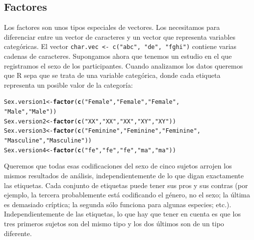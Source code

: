 \documentclass{config/apuntes}\usepackage[]{graphicx}\usepackage[]{xcolor}
\makeatletter
\newcommand{\hlsng}[1]{\textcolor[rgb]{0.192,0.494,0.8}{#1}}%
\newcommand{\hldef}[1]{\textcolor[rgb]{0.345,0.345,0.345}{#1}}%
\newcommand{\hlkwb}[1]{\textcolor[rgb]{0.69,0.353,0.396}{#1}}%
\newcommand{\hlkwd}[1]{\textcolor[rgb]{0.737,0.353,0.396}{\textbf{#1}}}%
\newenvironment{kframe}{%
 \def\at@end@of@kframe{}%
 \ifinner\ifhmode%
  \def\at@end@of@kframe{\end{minipage}}%
  \begin{minipage}{\columnwidth}%
 \fi\fi%
 \def\FrameCommand##1{\hskip\@totalleftmargin \hskip-\fboxsep
 \colorbox{shadecolor}{##1}\hskip-\fboxsep
     \hskip-\linewidth \hskip-\@totalleftmargin \hskip\columnwidth}%
 \MakeFramed {\advance\hsize-\width
   \@totalleftmargin\z@ \linewidth\hsize
   \@setminipage}}%
 {\par\unskip\endMakeFramed%
 \at@end@of@kframe}
\newenvironment{knitrout}{}{} %
\newcommand{\code}[1]{\texttt{#1}}
\makeatother
\begin{document}
\subsection{Factores}
Los factores son unos tipos especiales de vectores. Los necesitamos para diferenciar entre un vector de caracteres y un vector que representa variables categóricas. El vector \code{char.vec <- c("abc", "de", "fghi")} contiene varias cadenas de caracteres. Supongamos ahora que tenemos un estudio en el que registramos el sexo de los participantes. Cuando analizamos los datos queremos que R sepa que se trata de una variable categórica, donde cada etiqueta representa un posible valor de la categoría:
\begin{knitrout}
\color{fgcolor}\begin{kframe}
\begin{alltt}
\hldef{Sex.version1} \hlkwb{<-} \hlkwd{factor}\hldef{(}\hlkwd{c}\hldef{(}\hlsng{"Female"}\hldef{,} \hlsng{"Female"}\hldef{,} \hlsng{"Female"}\hldef{,}
                         \hlsng{"Male"}\hldef{,} \hlsng{"Male"}\hldef{))}
\hldef{Sex.version2} \hlkwb{<-} \hlkwd{factor}\hldef{(}\hlkwd{c}\hldef{(}\hlsng{"XX"}\hldef{,} \hlsng{"XX"}\hldef{,} \hlsng{"XX"}\hldef{,} \hlsng{"XY"}\hldef{,} \hlsng{"XY"}\hldef{))}
\hldef{Sex.version3} \hlkwb{<-} \hlkwd{factor}\hldef{(}\hlkwd{c}\hldef{(}\hlsng{"Feminine"}\hldef{,} \hlsng{"Feminine"}\hldef{,} \hlsng{"Feminine"}\hldef{,}
                         \hlsng{"Masculine"}\hldef{,} \hlsng{"Masculine"}\hldef{))}
\hldef{Sex.version4} \hlkwb{<-} \hlkwd{factor}\hldef{(}\hlkwd{c}\hldef{(}\hlsng{"fe"}\hldef{,} \hlsng{"fe"}\hldef{,} \hlsng{"fe"}\hldef{,} \hlsng{"ma"}\hldef{,} \hlsng{"ma"}\hldef{))}
\end{alltt}
\end{kframe}
\end{knitrout}

Queremos que todas esas codificaciones del sexo de cinco sujetos arrojen los mismos resultados de análisis, independientemente de lo que digan exactamente las etiquetas. Cada conjunto de etiquetas puede tener sus pros y sus contras (por ejemplo, la tercera probablemente está codificando el género, no el sexo; la última es demasiado críptica; la segunda sólo funciona para algunas especies; etc.). Independientemente de las etiquetas, lo que hay que tener en cuenta es que los tres primeros sujetos son del mismo tipo y los dos últimos son de un tipo diferente.
\end{document}
